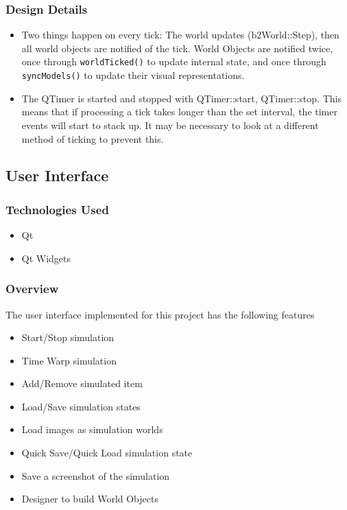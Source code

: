\subsubsection*{Design Details}
\begin{itemize}
	\item Two things happen on every tick: The world updates (b2World::Step), then all world objects are notified of the tick. World Objects are notified twice, once through \lstinline|worldTicked()| to update internal state, and once through \lstinline|syncModels()| to update their visual representations.
	\item The QTimer is started and stopped with QTimer::start, QTimer::stop. This means that if processing a tick takes longer than the set interval, the timer events will start to stack up. It may be necessary to look at a different method of ticking to prevent this.
\end{itemize}

\subsection{User Interface}
\subsubsection*{Technologies Used}
\begin{itemize}
	\item Qt
	\item Qt Widgets
\end{itemize}
\subsubsection*{Overview}
The user interface implemented for this project has the following features
\begin{itemize}
	\item Start/Stop simulation
	\item Time Warp simulation
	\item Add/Remove simulated item
	\item Load/Save simulation states
	\item Load images as simulation worlds
	\item Quick Save/Quick Load simulation state
	\item Save a screenshot of the simulation
	\item Designer to build World Objects
\end{itemize}

